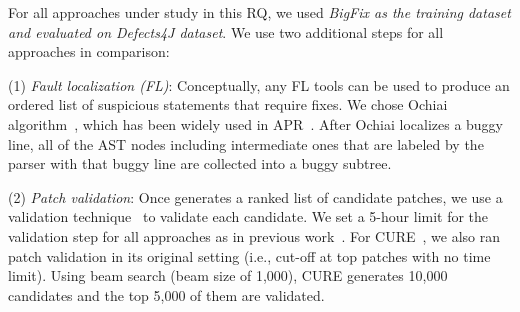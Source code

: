 



For all approaches under study in this RQ, we used {\em BigFix as the
  training dataset and evaluated on Defects4J dataset}.  We use two
additional steps for all approaches in comparison:

(1) {\em Fault localization (FL)}: Conceptually, any FL
tools can be used to produce an ordered list of suspicious
statements that require fixes. We chose Ochiai
algorithm~\cite{abreu2006evaluation, pearson2017evaluating}, which has
been widely used in
APR~\cite{jiang2018shaping,xiong2017precise,koyuncu2018fixminer,xin2017leveraging,wen2018context,liu2018lsrepair}.
After Ochiai localizes a buggy line, all of the AST nodes including
intermediate ones that are labeled by the parser with that buggy line
are collected into a buggy subtree.

(2) {\em Patch validation}: Once {\tool} generates a ranked list of
candidate patches, we use a validation
technique~\cite{saha2017elixir,jiang2018shaping} to validate each
candidate.
We set a 5-hour limit for the validation step for all approaches as in
previous work~\cite{icse20,tbar-issta19}.
For CURE~\cite{cure-icse21}, we also ran patch validation in its
original setting (i.e., cut-off at top patches with no time
limit). Using beam search (beam size of 1,000), CURE generates 10,000
candidates and the top 5,000 of them are validated.


